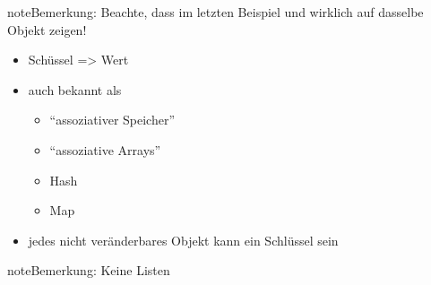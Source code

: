 \documentclass[letterpaper,10pt,ngerman]{sphinxmanual}
\begin{document}
\begin{notice}{note}{Bemerkung:}
Beachte, dass im letzten Beispiel  und  wirklich auf dasselbe
Objekt zeigen!
\begin{itemize}
\item {} 
Schüssel =\textgreater{} Wert

\item {} 
auch bekannt als
\begin{itemize}
\item {} 
``assoziativer Speicher''

\item {} 
``assoziative Arrays''

\item {} 
Hash

\item {} 
Map

\end{itemize}

\item {} 
jedes nicht veränderbares Objekt kann ein Schlüssel sein

\end{itemize}

\begin{notice}{note}{Bemerkung:}
Keine Listen
\end{notice}


\end{notice}
\end{document}
